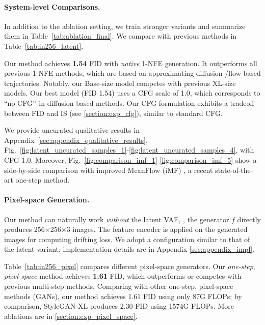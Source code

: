 
\paragraph{System-level Comparisons.} In addition to the ablation setting, we train stronger variants and summarize them in Table~\ref{tab:ablation_final}.
We compare with previous methods in Table~\ref{tab:in256_latent}.

Our method achieves \textbf{1.54} FID with \textit{native} 1-NFE generation. It outperforms all previous 1-NFE methods, which are based on approximating diffusion-/flow-based trajectories.
Notably, our Base-size model competes with previous XL-size models.
Our best model (FID 1.54) uses a CFG scale of 1.0, which corresponds to ``no CFG’’ in diffusion-based methods. 
Our CFG formulation exhibits a tradeoff between FID and IS (see \ref{section:exp_cfg}), similar to standard CFG.


We provide uncurated qualitative results in Appendix~\ref{sec:appendix_qualitative_results}, Fig.~\ref{fig:latent_uncurated_samples_1}-\ref{fig:latent_uncurated_samples_4}, with CFG 1.0.
Moreover, Fig.~\ref{fig:comparison_imf_1}-\ref{fig:comparison_imf_5} show a side-by-side comparison with improved MeanFlow (iMF) \cite{geng2025improved}, a recent state-of-the-art one-step method.

\paragraph{Pixel-space Generation.} Our method can naturally work \textit{without} the latent VAE, \ie, the generator $f$ directly produces 256$\times$256$\times$3 images. The feature encoder is applied on the generated images for computing drifting loss. We adopt a configuration similar to that of the latent variant; implementation details are in Appendix \ref{sec:appendix_impl}.

Table~\ref{tab:in256_pixel} compares different pixel-space generators.
Our \textit{one-step}, \textit{pixel-space} method achieves \textbf{1.61} FID, which outperforms or competes with previous multi-step methods.
Comparing with other one-step, pixel-space methods (GANs), our method achieves 1.61 FID using only 87G FLOPs; by comparison, StyleGAN-XL produces 2.30 FID using 1574G FLOPs. 
More ablations are in \ref{section:exp_pixel_space}.

